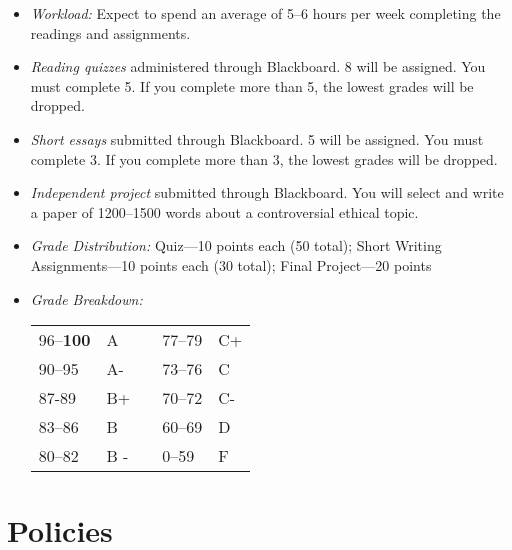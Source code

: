 \documentclass[article,oneside]{memoir}
\begin{document}
\begin{itemize}
\item \textit{Workload:} Expect to spend an average of 5--6 hours per week  completing the readings and assignments.

\item \textit{Reading quizzes} administered through Blackboard. 8 will be assigned. You must complete 5. If you complete more than 5, the lowest grades will be dropped. 

\item \textit{Short essays} submitted through Blackboard. 5 will be assigned. You must complete 3. If you complete more than 3, the lowest grades will be dropped. 

\item \textit{Independent project} submitted through Blackboard. You will select and write a paper of 1200--1500 words about a controversial ethical topic. 
 
\item \textit{Grade Distribution:}  Quiz---10 points each (50 total);  Short Writing Assignments---10 points each (30 total); Final Project---20 points 

\item \textit{Grade Breakdown:}

 \begin{tabular}{ | l | l | p{2cm} | l | l | }
    \hline 
96--\textbf{100} & A  & &  77--79 &  C+ \\  
90--95 & A- & &  73--76 & C \\
87-89 & B+ &  &  70--72 & C- \\ 
83--86 & B  & &  60--69 & D\\
80--82 & B - & & 0--59 & F\\ \hline
    \end{tabular}


\end{itemize}


\section{Policies}
\end{document}
